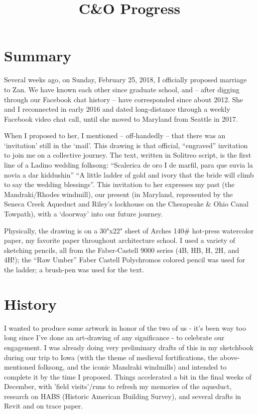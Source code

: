 ﻿\documentclass[letterpaper, 12pt, landscape]{ProgressBook}
\title{C\&O Progress}
\begin{document}
\fancyhead{} %


\section*{Summary}

Several weeks ago, on Sunday, February 25, 2018, I officially
proposed marriage to Zan. We have known each other since graduate school, and –
after digging through our Facebook chat history – have corresponded since about
2012. She and I reconnected in early 2016 and dated long-distance through a
weekly Facebook video chat call, until she moved to Maryland from Seattle in
2017.

When I proposed to her, I mentioned – off-handedly – that there
was an ‘invitation’ still in the ‘mail’. This drawing is that official,
“engraved” invitation to join me on a collective journey. The text, written in
Solitreo script, is the first line of a Ladino wedding folksong: “Scalerica de oro I de marfil, para que suvia la
novia a dar kiddushin” “A little ladder of gold and ivory that the bride will climb to say the wedding
blessings”. This invitation to her expresses my past (the Mandraki/Rhodes
windmill), our present (in Maryland, represented by the Seneca Creek Aqueduct
and Riley’s lockhouse on the Chesapeake \& Ohio Canal Towpath), with a
‘doorway’ into our future journey.

Physically, the drawing is on a 30"x22" sheet of Arches
140\# hot-press watercolor paper, my favorite paper throughout architecture
school. I used a variety of sketching pencils, all from the Faber-Castell 9000 series
(4B, HB, H, 2H, and 4H!); the “Raw Umber” Faber Castell Polychromos colored
pencil was used for the ladder; a brush-pen was used for the text.

\section*{History}

I wanted to produce some artwork in honor of the two of us - it's
been way too long since I've done an art-drawing of any significance - to
celebrate our engagement. I was already doing very preliminary drafts of this
in my sketchbook during our trip to Iowa (with the theme of medieval fortifications,
the above-mentioned folksong, and the iconic Mandraki windmills) and intended
to complete it by the time I proposed. Things accelerated a bit in the final
weeks of December, with 'field visits'/runs to refresh my memories of the
aqueduct, research on HABS (Historic American Building Survey), and several
drafts in Revit and on trace paper.
\end{document}

